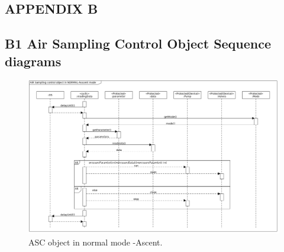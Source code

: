 \documentclass[a4paper,12pt,twoside]{article}
\providecommand{\DIFaddbegin}{} %
\providecommand{\DIFaddend}{} %
\providecommand{\DIFaddbeginFL}{} %
\providecommand{\DIFaddendFL}{} %
\providecommand{\DIFdelbeginFL}{} %
\providecommand{\DIFdelendFL}{} %
\newcommand{\DIFscaledelfig}{0.5}
\newlength{\DIFdelgraphicswidth} %
\newlength{\DIFdelgraphicsheight} %
\newcommand{\DIFaddincludegraphics}[2][]{{\color{blue}\fbox{\DIFOincludegraphics[#1]{#2}}}} %
\newcommand{\DIFdelincludegraphics}[2][]{%
\sbox{\DIFdelgraphicsbox}{\DIFOincludegraphics[#1]{#2}}%
\settoboxwidth{\DIFdelgraphicswidth}{\DIFdelgraphicsbox} %
\settoboxtotalheight{\DIFdelgraphicsheight}{\DIFdelgraphicsbox} %
\scalebox{\DIFscaledelfig}{%
\parbox[b]{\DIFdelgraphicswidth}{\usebox{\DIFdelgraphicsbox}\\[-\baselineskip] \rule{\DIFdelgraphicswidth}{0em}}\llap{\resizebox{\DIFdelgraphicswidth}{\DIFdelgraphicsheight}{%
\setlength{\unitlength}{\DIFdelgraphicswidth}%
\begin{picture}(1,1)%
\thicklines\linethickness{2pt} %
{\color[rgb]{1,0,0}\put(0,0){\framebox(1,1){}}}%
{\color[rgb]{1,0,0}\put(0,0){\line( 1,1){1}}}%
{\color[rgb]{1,0,0}\put(0,1){\line(1,-1){1}}}%
\end{picture}%
}\hspace*{3pt}}} %
} %
\DeclareRobustCommand{\DIFaddbegin}{\DIFOaddbegin \let\includegraphics\DIFaddincludegraphics} %
\DeclareRobustCommand{\DIFaddend}{\DIFOaddend \let\includegraphics\DIFOincludegraphics} %
\DeclareRobustCommand{\DIFaddbeginFL}{\DIFOaddbeginFL \let\includegraphics\DIFaddincludegraphics} %
\DeclareRobustCommand{\DIFaddendFL}{\DIFOaddendFL \let\includegraphics\DIFOincludegraphics} %
\DeclareRobustCommand{\DIFdelbeginFL}{\DIFOdelbeginFL \let\includegraphics\DIFdelincludegraphics} %
\DeclareRobustCommand{\DIFdelendFL}{\DIFOaddendFL \let\includegraphics\DIFOincludegraphics} %
\begin{document}
\DIFaddbegin \begin{landscape}
\DIFaddend \section{APPENDIX B} \label{sec:appB}
\DIFaddbegin 

\DIFaddend \subsection*{B1 Air Sampling Control Object Sequence diagrams}
\begin{figure}[H]
    \centering
    \DIFdelbeginFL %
\DIFdelendFL \DIFaddbeginFL \includegraphics[height=0.75\textwidth]{appendix/img/ASC-seq-dia-v1-2-a.png}
    \DIFaddendFL \caption{ASC object in normal mode -Ascent.}
    \label{ASCa}
\end{figure}
\DIFaddbegin 


\end{landscape}
\end{document}
